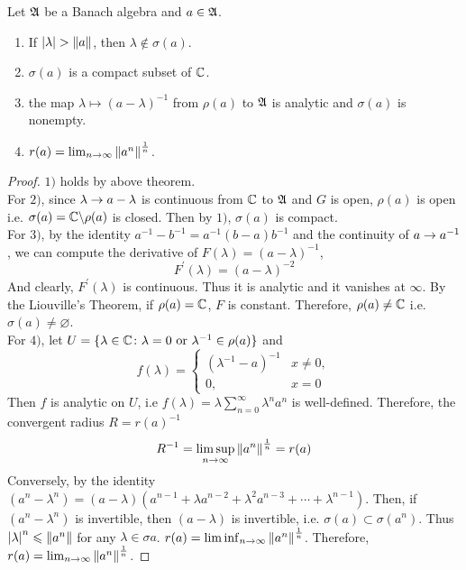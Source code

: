 \documentclass[a4paper,11pt]{report}
\begin{document}
\begin{thm}
	Let $\mathfrak{A}$ be a Banach algebra and $a \in \mathfrak{A}$.
	\begin{enumerate}[label=\arabic*)]
		\item If $\left\lvert\lambda\right\lvert > \left\lVert a\right\lVert$, then $\lambda \notin \sigma(a)$.
		\item $\sigma(a)$ is a compact subset of $\mathbb{C}$.
		\item the map $\lambda \mapsto (a-\lambda)^{-1}$ from $\rho(a)$ to $\mathfrak{A}$ is analytic and $\sigma(a)$ is nonempty.
		\item $r(a)=\lim_{n \rightarrow \infty} \left\lVert a^{n}\right\lVert^{\frac{1}{n}}$.
	\end{enumerate}
\end{thm}
\begin{proof}
	$1)$ holds by above theorem. \\
	For $2)$, since $\lambda \rightarrow a-\lambda$ is continuous from $\mathbb{C}$ to $\mathfrak{A}$ and $G$ is open, $\rho(a)$ is open i.e. $\sigma(a)=\mathbb{C} \backslash \rho(a)$ is closed. Then by $1)$, $\sigma(a)$ is compact.\\
	For $3)$, by the identity $a^{-1} - b^{-1} = a^{-1}(b-a)b^{-1}$ and the continuity of $a \rightarrow a^{-1}$, we can compute the derivative of $F(\lambda) = (a-\lambda)^{-1}$,
	\begin{equation*}
		F^{'}(\lambda) = (a-\lambda)^{-2}
	\end{equation*}
	And clearly, $F^{'}(\lambda)$ is continuous. Thus it is analytic and it vanishes at $\infty$. By the Liouville's Theorem, if $\rho(a) = \mathbb{C}$, $F$ is constant. Therefore, $\rho(a) \neq \mathbb{C}$ i.e. $\sigma(a) \neq \varnothing$.\\
	For $4)$, let $U=\{\lambda \in \mathbb{C} \colon \lambda = 0 \text{ or } \lambda^{-1} \in \rho(a)\}$ and 
	\begin{equation*}
		f(\lambda) = 
		\begin{cases}
			(\lambda^{-1}-a)^{-1} & x \neq 0,\\
			0,& x = 0
		\end{cases}
	\end{equation*}
	Then $f$ is analytic on $U$, i.e $f(\lambda)=\lambda\sum_{n=0}^{\infty} \lambda^{n} a^{n}$ is well-defined. Therefore, the convergent radius $R = r(a)^{-1}$
	\begin{equation*}
		R^{-1} = \limsup_{n \rightarrow \infty} \left\lVert a^{n}\right\lVert^{\frac{1}{n}} = r(a)
	\end{equation*}
	Conversely, by the identity $(a^{n}-\lambda^{n}) = (a-\lambda)(a^{n-1}+\lambda a^{n-2}+\lambda^{2} a^{n-3} + \cdots + \lambda^{n-1})$. Then, if $(a^{n}-\lambda^{n})$ is invertible, then $(a-\lambda)$ is invertible, i.e. $\sigma(a) \subset \sigma(a^{n})$. Thus $\left\lvert\lambda\right\lvert^{n} \leqslant \left\lVert a^{n}\right\lVert$ for any $\lambda \in \sigma{a}$. $r(a)=\liminf_{n \rightarrow \infty}\left\lVert a^{n}\right\lVert^{\frac{1}{n}}$. Therefore, $r(a)=\lim_{n \rightarrow \infty} \left\lVert a^{n}\right\lVert^{\frac{1}{n}}$.
\end{proof}
\end{document}
